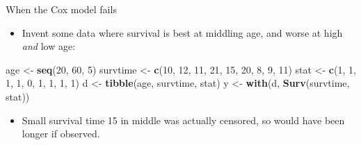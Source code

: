 \documentclass[ignorenonframetext,]{beamer}
\newenvironment{Shaded}{\begin{snugshade}}{\end{snugshade}}
\newcommand{\DecValTok}[1]{\textcolor[rgb]{0.00,0.00,0.81}{#1}}
\newcommand{\KeywordTok}[1]{\textcolor[rgb]{0.13,0.29,0.53}{\textbf{#1}}}
\newcommand{\NormalTok}[1]{#1}
\newcommand{\StringTok}[1]{\textcolor[rgb]{0.31,0.60,0.02}{#1}}
\providecommand{\tightlist}{%
  \setlength{\itemsep}{0pt}\setlength{\parskip}{0pt}}
\begin{document}
\begin{frame}[fragile]{When the Cox model fails}
\protect\hypertarget{when-the-cox-model-fails}{}

\begin{itemize}
\tightlist
\item
  Invent some data where survival is best at middling age, and worse at
  high \emph{and} low age:
\end{itemize}

\begin{Shaded}
\begin{Highlighting}[]
\NormalTok{age <-}\StringTok{ }\KeywordTok{seq}\NormalTok{(}\DecValTok{20}\NormalTok{, }\DecValTok{60}\NormalTok{, }\DecValTok{5}\NormalTok{)}
\NormalTok{survtime <-}\StringTok{ }\KeywordTok{c}\NormalTok{(}\DecValTok{10}\NormalTok{, }\DecValTok{12}\NormalTok{, }\DecValTok{11}\NormalTok{, }\DecValTok{21}\NormalTok{, }\DecValTok{15}\NormalTok{, }\DecValTok{20}\NormalTok{, }\DecValTok{8}\NormalTok{, }\DecValTok{9}\NormalTok{, }\DecValTok{11}\NormalTok{)}
\NormalTok{stat <-}\StringTok{ }\KeywordTok{c}\NormalTok{(}\DecValTok{1}\NormalTok{, }\DecValTok{1}\NormalTok{, }\DecValTok{1}\NormalTok{, }\DecValTok{1}\NormalTok{, }\DecValTok{0}\NormalTok{, }\DecValTok{1}\NormalTok{, }\DecValTok{1}\NormalTok{, }\DecValTok{1}\NormalTok{, }\DecValTok{1}\NormalTok{)}
\NormalTok{d <-}\StringTok{ }\KeywordTok{tibble}\NormalTok{(age, survtime, stat)}
\NormalTok{y <-}\StringTok{ }\KeywordTok{with}\NormalTok{(d, }\KeywordTok{Surv}\NormalTok{(survtime, stat))}
\end{Highlighting}
\end{Shaded}

\begin{itemize}
\tightlist
\item
  Small survival time 15 in middle was actually censored, so would have
  been longer if observed.
\end{itemize}

\end{frame}
\end{document}
